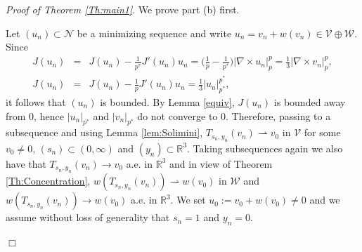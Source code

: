 \documentclass[12pt,leqno,twoside]{amsart}
\newenvironment{altproof}[1]
{\noindent%
{\em Proof of {#1}}.}
{\nopagebreak\mbox{}\hfill $\Box$\par\addvspace{0.5cm}}
\def\R{\mathbb{R}}
\newcommand{\cN}{{\mathcal N}}
\newcommand{\cV}{{\mathcal V}}
\newcommand{\cW}{{\mathcal W}}
\def\curlop{\nabla\times}
\newcommand{\weakto}{\rightharpoonup}
\numberwithin{equation}{section}
\begin{document}
\begin{altproof}{Theorem \ref{Th:main1}} We prove part (b) first. 

Let  $(u_n)\subset \cN$ be a minimizing sequence  and write $u_n=v_n+w(v_n)\in\cV\oplus\cW$. Since
\begin{eqnarray} \label{ac}
J(u_n)&=&J(u_n) -\frac1{p^*}J'(u_n)u_n = \Big(\frac1p-\frac{1}{p^*}\Big)|\curlop u_n|^p_p = \frac13|\curlop v_n|^p_p,\\\label{ca}
J(u_n)&=&J(u_n) -\frac1pJ'(u_n)u_n  = \frac13|u_n|^{p^*}_{p^*},
\end{eqnarray}
it follows that $(u_n)$ is bounded.  By Lemma \ref{equiv}, $J(u_n)$ is bounded away from $0$, hence $|u_n|_{p^*}$ and  $|v_n|_{p^*}$ do not converge to $0$.
Therefore, passing to a subsequence and using Lemma \ref{lem:Solimini}, $T_{s_n,y_n}(v_n)\weakto v_0$ in $\cV$ for some $v_0\neq 0$, $(s_n)\subset (0,\infty)$ and $(y_n)\subset \R^3$. Taking subsequences again we also have that $T_{s_n,y_n}(v_n)\to v_0$ a.e. in $\R^3$ and in view of Theorem \ref{Th:Concentration}, $w(T_{s_n,y_n}(v_n))\weakto w(v_0)$ in $\cW$ and $w(T_{s_n,y_n}(v_n))\to w(v_0)$ a.e. in $\R^3$. We set $u_0:=v_0+w(v_0)\neq 0$ and we assume without loss of generality that $s_n=1$ and $y_n=0$. 


\end{altproof}
\end{document}
